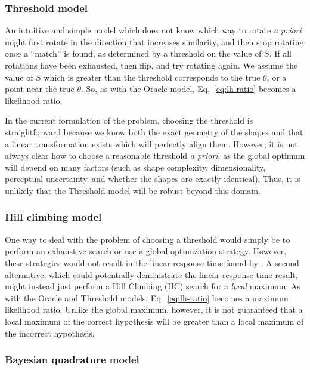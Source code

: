 \documentclass[10pt,letterpaper]{article}
\newcommand{\Oc}[0]{Oracle}
\newcommand{\Th}[0]{Threshold}
\newcommand{\Hc}[0]{HC}
\begin{document}
\subsubsection{Threshold model}

An intuitive and simple model which does not know which way to rotate
\textit{a priori} might first rotate in the direction that increases
similarity, and then stop rotating once a ``match'' is found, as
determined by a threshold on the value of $S$. If all rotations have
been exhausted, then flip, and try rotating again. We assume the value
of $S$ which is greater than the threshold corresponds to the true
$\theta$, or a point near the true $\theta$. So, as with the \Oc{}
model, Eq.~\ref{eq:lh-ratio} becomes a likelihood ratio.

In the current formulation of the problem, choosing the threshold is
straightforward because we know both the exact geometry of the shapes
and that a linear transformation exists which will perfectly align
them. However, it is not always clear how to choose a reasonable
threshold \textit{a priori}, as the global optimum will depend on many
factors (such as shape complexity, dimensionality, perceptual
uncertainty, and whether the shapes are exactly identical). Thus, it
is unlikely that the \Th{} model will be robust beyond this domain.

\subsubsection{Hill climbing model}

One way to deal with the problem of choosing a threshold would simply
be to perform an exhaustive search or use a global optimization
strategy. However, these strategies would not result in the linear
response time found by . A second alternative,
which could potentially demonstrate the linear response time result,
might instead just perform a Hill Climbing (\Hc{}) search for a
\textit{local} maximum. As with the \Oc{} and \Th{} models,
Eq.~\ref{eq:lh-ratio} becomes a maximum likelihood ratio. Unlike the
global maximum, however, it is not guaranteed that a local maximum of
the correct hypothesis will be greater than a local maximum of the
incorrect hypothesis.

\subsubsection{Bayesian quadrature model}
\end{document}
